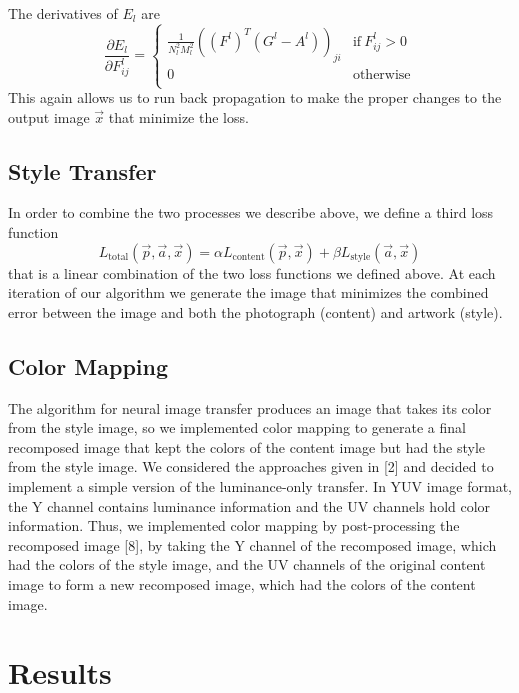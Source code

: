 \documentclass[10pt,twocolumn,letterpaper]{article}
\begin{document}
The derivatives of $E_l$ are
\[ \frac{ \partial E_l}{\partial F_{ij}^l} = \left\{
    \begin{array}{ll}
         \frac{1}{N_l^2 M_l^2} ((F^l)^T (G^l - A^l))_{ji} &\text{if} \ F_{ij}^l > 0 \\
         0 & \text{otherwise} \\
    \end{array} 
\right. \]
This again allows us to run back propagation to make the proper changes to the output image $\vec{x}$ that minimize the loss.

\subsection{Style Transfer}

In order to combine the two processes we describe above, we define a third loss function
\[ L_{\text{total}}(\vec{p}, \vec{a}, \vec{x}) = \alpha L_{\text{content}}(\vec{p}, \vec{x}) + \beta L_{\text{style}} (\vec{a}, \vec{x}) \]
that is a linear combination of the two loss functions we defined above. At each iteration of our algorithm we generate the image that minimizes the combined error between the image and both the photograph (content) and artwork (style). 

\subsection{Color Mapping}

The algorithm for neural image transfer produces an image that takes its color from the style image, so we implemented color mapping to generate a final recomposed image that kept the colors of the content image but had the style from the style image. We considered the approaches given in [2] and decided to implement a simple version of the luminance-only transfer. In YUV image format, the Y channel contains luminance information and the UV channels hold color information. Thus, we implemented color mapping by post-processing the recomposed image [8], by taking the Y channel of the recomposed image, which had the colors of the style image, and the UV channels of the original content image to form a new recomposed image, which had the colors of the content image. 

\section{Results}
\end{document}
